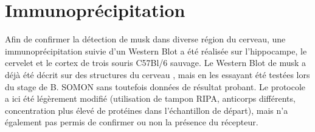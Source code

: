 \section{Immunoprécipitation}
\label{sec:IPresultat}
Afin de confirmer la détection de \gls{musk} dans diverse région du cerveau, une immunoprécipitation suivie d'un Western Blot a été réalisée sur l'hippocampe, le cervelet et le cortex de trois souris C57Bl/6 sauvage. Le Western Blot de \gls{musk} a déjà été décrit sur des structures du cerveau \cite{Garcia-Osta2006}, mais en les essayant été testées lors du stage de B. SOMON sans toutefois données de résultat probant. Le protocole a ici été légèrement modifié (utilisation de tampon RIPA, anticorps différents, concentration plus élevé de protéines dans l'échantillon de départ), mais n'a également pas permis de confirmer ou non la présence du récepteur.

